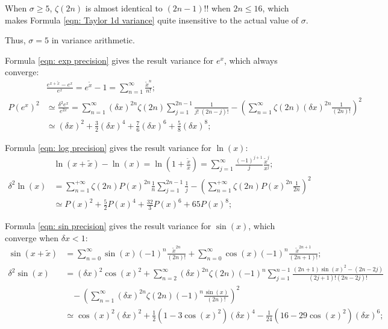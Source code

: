 \documentclass[twoside]{article}
\numberwithin{equation}{section}
\newcommand{\eqspace}{\;\;\;}
\begin{document}
When $\sigma \geq 5$, $\zeta(2n)$ is almost identical to $(2n -1)!!$ when $2n \leq 16$, which makes Formula \eqref{eqn: Taylor 1d variance} quite insensitive to the actual value of $\sigma$.

Thus, $\sigma = 5$ in variance arithmetic.

Formula \eqref{eqn: exp precision} gives the result variance for $e^x$, which always converge:
\begin{align}
\label{eqn: exp Taylor}
&\frac{e^{x + \tilde{x}} - e^x}{e^x} = e^{\tilde{x}} - 1 = \sum_{n=1}^{\infty} \frac{\tilde{x}^n}{n!}; \\
\label{eqn: exp precision}
P(e^x)^2 &\simeq \frac{\delta^2 e^x}{e^{2x}} = \sum_{n=1}^{\infty} (\delta x)^{2n} \zeta(2n) \sum_{j=1}^{2n-1} \frac{1}{j!\;(2n - j)!}
 - \left( \sum_{n=1}^{\infty} \zeta(2n) (\delta x)^{2n} \frac{1}{(2n)!} \right)^2 \\
 &\simeq (\delta x)^2 + \frac{3}{2} (\delta x)^4 + \frac{7}{6} (\delta x)^6 + \frac{5}{8} (\delta x)^8;
\end{align}

Formula \eqref{eqn: log precision} gives the result variance for $\ln(x)$:
\begin{align}
\label{eqn: log Taylor}
& \ln(x + \tilde{x}) - \ln(x) = \ln(1 + \frac{\tilde{x}}{x}) = \sum_{j=1}^{\infty} \frac{(-1)^{j+1}}{j} \frac{\tilde{x}^j}{x^j}; \\
\label{eqn: log precision}
\delta^2 \ln(x) &= \sum_{n=1}^{+\infty} \zeta(2n) P(x)^{2n} \frac{1}{n} \sum_{j=1}^{2n-1} \frac{1}{j}
   - \left( \sum_{n=1}^{+\infty} \zeta(2n) P(x)^{2n} \frac{1}{2n} \right)^2 \\
 &\simeq P(x)^2 + \frac{5}{2} P(x)^4 + \frac{32}{3} P(x)^6 + 65 P(x)^8; 
\end{align}

Formula \eqref{eqn: sin precision} gives the result variance for $\sin(x)$, which converge when $\delta x < 1$:
\begin{align}
\label{eqn: sin Taylor}
\sin(x + \tilde{x}) &= \sum_{n=0}^{\infty} \sin(x) (-1)^{n} \frac{\tilde{x}^{2n}}{(2n)!} + \sum_{n=0}^{\infty} \cos(x) (-1)^n \frac{\tilde{x}^{2n+1}}{(2n + 1)!}; \\
\label{eqn: sin precision}
\delta^2 \sin(x) &= (\delta x)^2 \cos(x)^2 + \sum_{n=2}^{\infty} (\delta x)^{2n} \zeta(2n) (-1)^{n} \sum_{j=1}^{n-1} \frac{(2n+1)\sin(x)^2 - (2n-2j)}{(2j+1)!(2n-2j)!} \nonumber \\
 &\eqspace - \left(\sum_{n=1}^{\infty}(\delta x)^{2n} \zeta(2n) (-1)^{n} \frac{\sin(x)}{(2n)!}\right)^2   \\
 &\simeq \cos(x)^2 (\delta x)^2 + \frac{1} {2}(1 - 3 \cos(x)^2) (\delta x)^4 - \frac{1}{24} (16 - 29 \cos(x)^2) (\delta x)^6;
\end{align}
\end{document}
